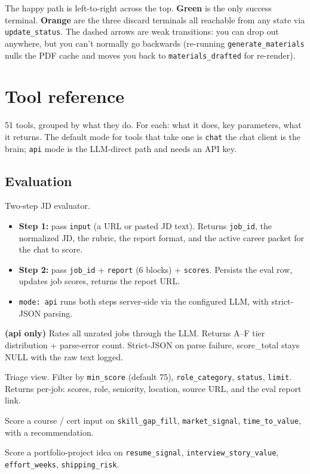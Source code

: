 \documentclass[11pt,letterpaper]{article}
\newcommand{\tool}[1]{\texttt{#1}}
\begin{document}
The happy path is left-to-right across the top. \textbf{Green} is the only success terminal. \textbf{Orange} are the three discard terminals \textemdash{} all reachable from any state via \tool{update\_status}. The dashed arrows are weak transitions: you can drop out anywhere, but you can't normally go backwards (re-running \tool{generate\_materials} nulls the PDF cache and moves you back to \texttt{materials\_drafted} for re-render).

\section{Tool reference}

51 tools, grouped by what they do. For each: what it does, key parameters, what it returns. The default mode for tools that take one is \texttt{chat} \textemdash{} the chat client is the brain; \texttt{api} mode is the LLM-direct path and needs an API key.

\subsection*{Evaluation}

\begin{description}[leftmargin=0pt]
\item[\tool{evaluate\_job}] Two-step JD evaluator.
  \begin{itemize}
    \item \textbf{Step 1:} pass \texttt{input} (a URL or pasted JD text). Returns \texttt{job\_id}, the normalized JD, the rubric, the report format, and the active career packet for the chat to score.
    \item \textbf{Step 2:} pass \texttt{job\_id} + \texttt{report} (6 blocks) + \texttt{scores}. Persists the eval row, updates job scores, returns the report URL.
    \item \texttt{mode: api} runs both steps server-side via the configured LLM, with strict-JSON parsing.
  \end{itemize}
\item[\tool{batch\_evaluate}] \textbf{(api only)} Rates all unrated jobs through the LLM. Returns A--F tier distribution + parse-error count. Strict-JSON \textemdash{} on parse failure, score\_total stays NULL with the raw text logged.
\item[\tool{get\_top\_jobs}] Triage view. Filter by \texttt{min\_score} (default 75), \texttt{role\_category}, \texttt{status}, \texttt{limit}. Returns per-job: scores, role, seniority, location, source URL, and the eval report link.
\item[\tool{evaluate\_training}] Score a course / cert input on \texttt{skill\_gap\_fill}, \texttt{market\_signal}, \texttt{time\_to\_value}, with a recommendation.
\item[\tool{evaluate\_project}] Score a portfolio-project idea on \texttt{resume\_signal}, \texttt{interview\_story\_value}, \texttt{effort\_weeks}, \texttt{shipping\_risk}.
\end{description}
\end{document}
